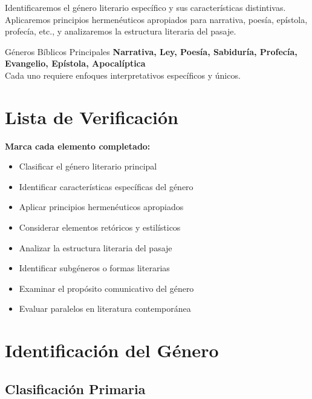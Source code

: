 \documentclass[11pt,a4paper]{article}
\begin{document}
Identificaremos el género literario específico y sus características distintivas. Aplicaremos principios hermenéuticos apropiados para narrativa, poesía, epístola, profecía, etc., y analizaremos la estructura literaria del pasaje.

\begin{infobox}{Géneros Bíblicos Principales}
\textbf{Narrativa, Ley, Poesía, Sabiduría, Profecía, Evangelio, Epístola, Apocalíptica}\\
Cada uno requiere enfoques interpretativos específicos y únicos.
\end{infobox}

\section{Lista de Verificación}

\begin{checklistbox}
\textbf{Marca cada elemento completado:}

\begin{itemize}[leftmargin=1cm]
    \item[$\square$] Clasificar el género literario principal
    \item[$\square$] Identificar características específicas del género
    \item[$\square$] Aplicar principios hermenéuticos apropiados
    \item[$\square$] Considerar elementos retóricos y estilísticos
    \item[$\square$] Analizar la estructura literaria del pasaje
    \item[$\square$] Identificar subgéneros o formas literarias
    \item[$\square$] Examinar el propósito comunicativo del género
    \item[$\square$] Evaluar paralelos en literatura contemporánea
\end{itemize}
\end{checklistbox}

\newpage

\section{Identificación del Género}

\subsection{Clasificación Primaria}
\end{document}
